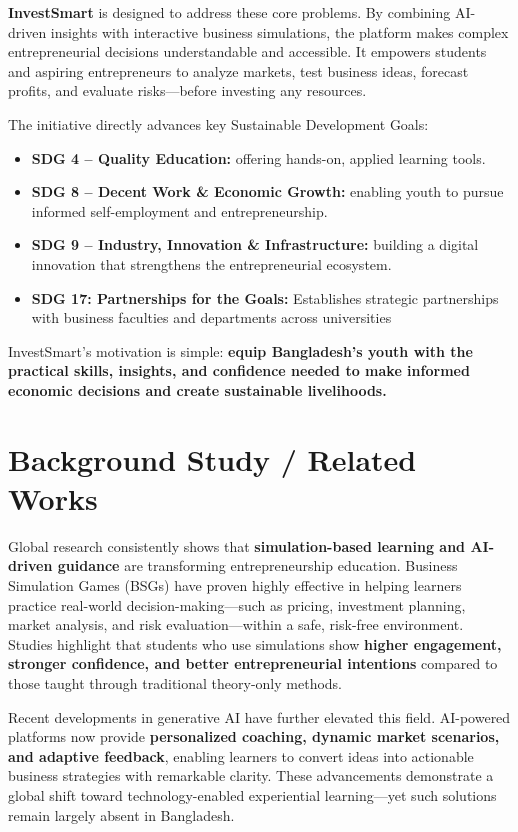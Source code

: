 \documentclass[12pt,letterpaper]{article}
\begin{document}
\textbf{InvestSmart} is designed to address these core problems. By combining AI-driven insights with interactive business simulations, the platform makes complex entrepreneurial decisions understandable and accessible. It empowers students and aspiring entrepreneurs to analyze markets, test business ideas, forecast profits, and evaluate risks—before investing any resources.

The initiative directly advances key Sustainable Development Goals:

\begin{itemize}
    \item \textbf{SDG 4 – Quality Education:} offering hands-on, applied learning tools.
    \item \textbf{SDG 8 – Decent Work \& Economic Growth:} enabling youth to pursue informed self-employment and entrepreneurship.
    \item \textbf{SDG 9 – Industry, Innovation \& Infrastructure:} building a digital innovation that strengthens the entrepreneurial ecosystem.
    \item \textbf{SDG 17: Partnerships for the Goals: }
    Establishes strategic partnerships with business faculties and departments across universities
 
\end{itemize}

InvestSmart's motivation is simple: \textbf{equip Bangladesh's youth with the practical skills, insights, and confidence needed to make informed economic decisions and create sustainable livelihoods.}

\section{Background Study / Related Works}

Global research consistently shows that \textbf{simulation-based learning and AI-driven guidance} are transforming entrepreneurship education. Business Simulation Games (BSGs) have proven highly effective in helping learners practice real-world decision-making—such as pricing, investment planning, market analysis, and risk evaluation—within a safe, risk-free environment. Studies highlight that students who use simulations show \textbf{higher engagement, stronger confidence, and better entrepreneurial intentions} compared to those taught through traditional theory-only methods.

Recent developments in generative AI have further elevated this field. AI-powered platforms now provide \textbf{personalized coaching, dynamic market scenarios, and adaptive feedback}, enabling learners to convert ideas into actionable business strategies with remarkable clarity. These advancements demonstrate a global shift toward technology-enabled experiential learning—yet such solutions remain largely absent in Bangladesh.
\end{document}

